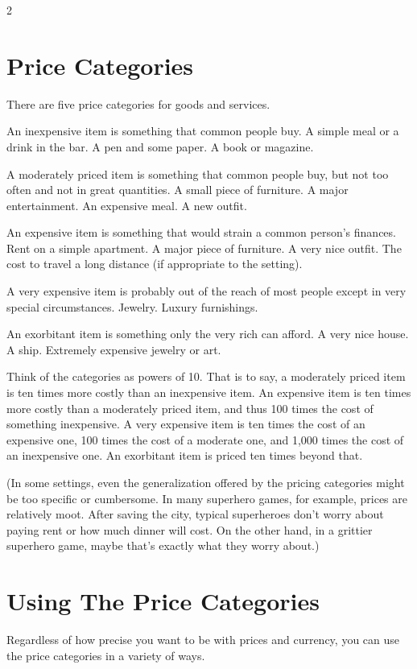 \begin{multicols}{2}
\section{Price Categories}

There are five price categories for goods and services.

An inexpensive item is something that common people buy. A simple meal or a drink in the bar. A pen and some paper. A book or magazine. 

A moderately priced item is something that common people buy, but not too often and not in great quantities. A small piece of furniture. A major entertainment. An expensive meal. A new outfit.

An expensive item is something that would strain a common person’s finances. Rent on a simple apartment. A major piece of furniture. A very nice outfit. The cost to travel a long distance (if appropriate to the setting).

A very expensive item is probably out of the reach of most people except in very special circumstances. Jewelry. Luxury furnishings. 

An exorbitant item is something only the very rich can afford. A very nice house. A ship. Extremely expensive jewelry or art.

Think of the categories as powers of 10. That is to say, a moderately priced item is ten times more costly than an inexpensive item. An expensive item is ten times more costly than a moderately priced item, and thus 100 times the cost of something inexpensive. A very expensive item is ten times the cost of an expensive one, 100 times the cost of a moderate one, and 1,000 times the cost of an inexpensive one. An exorbitant item is priced ten times beyond that.

(In some settings, even the generalization offered by the pricing categories might be too specific or cumbersome. In many superhero games, for example, prices are relatively moot. After saving the city, typical superheroes don’t worry about paying rent or how much dinner will cost. On the other hand, in a grittier superhero game, maybe that’s exactly what they worry about.)

\section{Using The Price Categories}

Regardless of how precise you want to be with prices and currency, you can use the price categories in a variety of ways.


\end{multicols}

